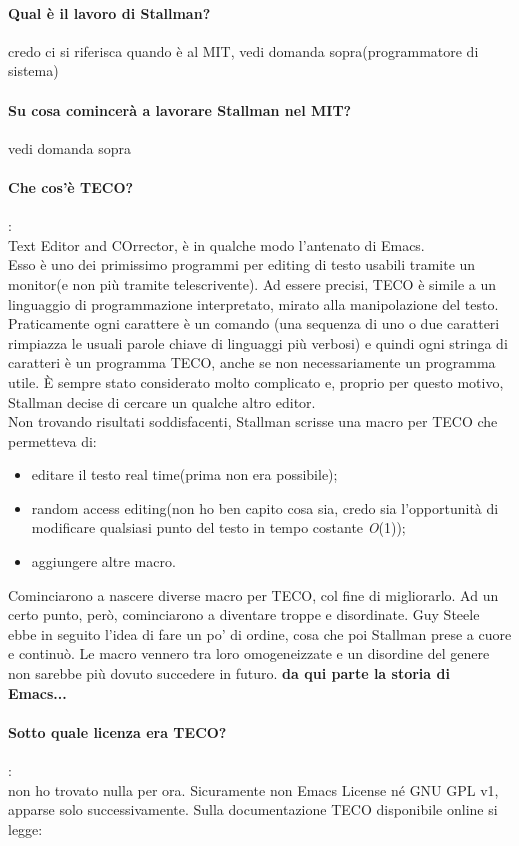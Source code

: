 \documentclass[a4paper]{article}
\begin{document}
		\paragraph{Qual è il lavoro di Stallman?}
		credo ci si riferisca quando è al MIT, vedi domanda sopra(programmatore di sistema)
		\paragraph{Su cosa comincerà a lavorare Stallman nel MIT?}
		vedi domanda sopra
		\paragraph{Che cos'è TECO?}: \\
		Text Editor and COrrector, è in qualche modo l'antenato di Emacs.\\
		Esso è uno dei primissimo programmi per editing di testo usabili tramite un monitor(e non più tramite telescrivente). Ad essere precisi, TECO è simile a un linguaggio di programmazione interpretato, mirato alla manipolazione del testo. Praticamente ogni carattere è un comando (una sequenza di uno o due caratteri rimpiazza le usuali parole chiave di linguaggi più verbosi) e quindi ogni stringa di caratteri è un programma TECO, anche se non necessariamente un programma utile. È sempre stato considerato molto complicato e, proprio per questo motivo, Stallman decise di cercare un qualche altro editor. \\
		Non trovando risultati soddisfacenti, Stallman scrisse una macro per TECO che permetteva di:
		\begin{itemize}
			\item editare il testo real time(prima non era possibile);
			\item random access editing(non ho ben capito cosa sia, credo sia l'opportunità di modificare qualsiasi punto del testo in tempo costante \textit{O}(1));
			\item aggiungere altre macro.
		\end{itemize}
		Cominciarono a nascere diverse macro per TECO, col fine di migliorarlo.
		Ad un certo punto, però, cominciarono a diventare troppe e disordinate. Guy Steele ebbe in seguito l'idea di fare un po' di ordine, cosa che poi Stallman prese a cuore e continuò. Le macro vennero tra loro omogeneizzate e un disordine del genere non sarebbe più dovuto succedere in futuro. \textbf{da qui parte la storia di Emacs...}
	
		\paragraph{Sotto quale licenza era TECO?}:\\
		non ho trovato nulla per ora. Sicuramente non Emacs License né GNU GPL v1, apparse solo successivamente.
		Sulla documentazione TECO disponibile online si legge:\\
\end{document}
